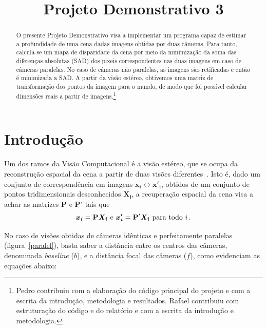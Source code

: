 \documentclass{bmvc2k}
\title{Projeto Demonstrativo 3}
\begin{document}
\begin{NoHyper}
\maketitle
\end{NoHyper}

\begin{abstract}
O presente Projeto Demonstrativo visa a implementar um programa capaz de estimar a profundidade de uma cena dadas imagens obtidas por duas câmeras. Para tanto, calcula-se um mapa de disparidade da cena por meio da minimização da soma das diferenças absolutas (SAD) dos pixeis correspondentes nas duas imagens em caso de câmeras paralelas. No caso de câmeras não paralelas, as imagens são retificadas e então é minimizada a SAD. A partir da visão estéreo, obtivemos uma matriz de transformação dos pontos da imagem para o mundo, de modo que foi possível calcular dimensões reais a partir de imagens.\footnote{Pedro contribuiu com a elaboração do código principal do projeto e com a escrita da introdução, metodologia e resultados. Rafael contribuiu com estruturação do código e do relatório e com a escrita da introdução e metodologia.}
\end{abstract}

\section{Introdução}
\label{sec:intro}

Um dos ramos da Visão Computacional é a visão estéreo, que se ocupa da reconstrução espacial da cena a partir de duas visões diferentes~\cite{Hartley:2003:MVG:861369}. Isto é, dado um conjunto de correspondência em imagens $\bm{x_i} \leftrightarrow \bm{x'_i}$, obtidos de um conjunto de pontos tridimensionais desconhecidos $\bm{X_i}$, a recuperação espacial da cena visa a achar as matrizes $\mathbf{P}$ e $\mathbf{P'}$ tais que
\begin{equation}
\centering
\label{Pmatrix}
\bm{x_i}=\mathbf{P}\bm{X_i}~\text{e}~ \bm{x'_i}=\mathbf{P'}\bm{X_i}~\text{para todo}~i\,.
\end{equation}

No caso de visões obtidas de câmeras idênticas e perfeitamente paralelas (figura~\ref{paralel}), basta saber a distância entre os centros das câmeras, denominada \textit{baseline} ($b$), e a distância focal das câmeras ($f$), como evidenciam as equações abaixo:
\end{document}
